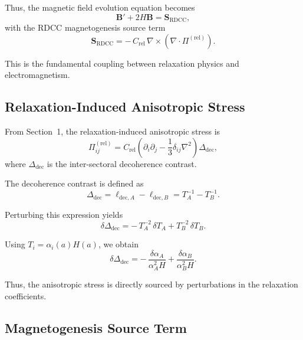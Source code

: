\documentclass[11pt,a4paper]{article}
\begin{document}
Thus, the magnetic field evolution equation becomes
\begin{equation}
\mathbf{B}' + 2H\mathbf{B}
=
\mathbf{S}_{\mathrm{RDCC}},
\label{eq:Bevol2}
\end{equation}
with the RDCC magnetogenesis source term
\begin{equation}
\mathbf{S}_{\mathrm{RDCC}}
=
-\,C_{\mathrm{rel}}\,
\nabla \times
\left(
\nabla \cdot \Pi^{(\mathrm{rel})}
\right).
\label{eq:SRDCC}
\end{equation}

This is the fundamental coupling between relaxation physics and electromagnetism.

\subsection{Relaxation-Induced Anisotropic Stress}

From Section~1, the relaxation-induced anisotropic stress is
\begin{equation}
\Pi^{(\mathrm{rel})}_{ij}
=
C_{\mathrm{rel}}
\left(
\partial_{i}\partial_{j}
-
\frac{1}{3}\delta_{ij}\nabla^{2}
\right)
\Delta_{\mathrm{dec}},
\label{eq:Pirel}
\end{equation}
where $\Delta_{\mathrm{dec}}$ is the inter-sectoral decoherence contrast.

The decoherence contrast is defined as
\begin{equation}
\Delta_{\mathrm{dec}}
=
\ell_{\mathrm{dec},A}
-
\ell_{\mathrm{dec},B}
=
T_{A}^{-1}
-
T_{B}^{-1}.
\end{equation}

Perturbing this expression yields
\begin{equation}
\delta\Delta_{\mathrm{dec}}
=
-\,T_{A}^{-2}\,\delta T_{A}
+
T_{B}^{-2}\,\delta T_{B}.
\label{eq:dDdec}
\end{equation}

Using $T_{i} = \alpha_{i}(a) H(a)$, we obtain
\begin{equation}
\delta\Delta_{\mathrm{dec}}
=
-\,\frac{\delta\alpha_{A}}{\alpha_{A}^{2}H}
+
\frac{\delta\alpha_{B}}{\alpha_{B}^{2}H}.
\label{eq:dDdec2}
\end{equation}

Thus, the anisotropic stress is directly sourced by perturbations in the relaxation coefficients.

\subsection{Magnetogenesis Source Term}
\end{document}
